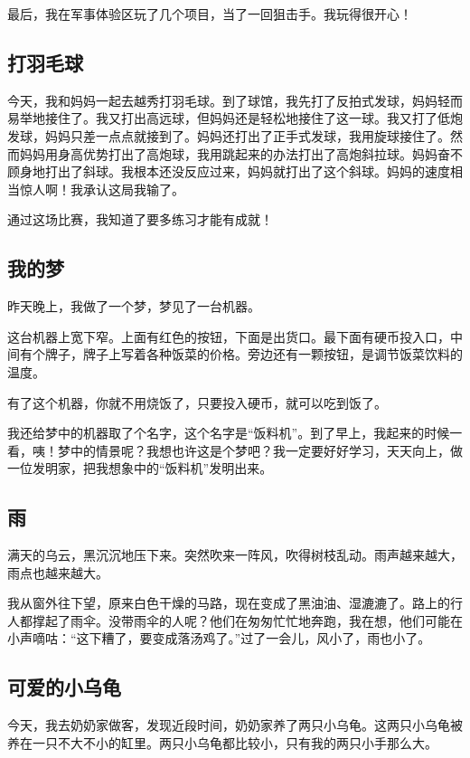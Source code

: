 \documentclass[UTF8,a4paper,titlepage,twoside,10.5pt]{article}
\begin{document}
最后，我在军事体验区玩了几个项目，当了一回狙击手。我玩得很开心！

\subsection{打羽毛球}
\label{sec:orgbea438a}

今天，我和妈妈一起去越秀打羽毛球。到了球馆，我先打了反拍式发球，妈妈轻而易举地接住了。我又打出高远球，但妈妈还是轻松地接住了这一球。我又打了低炮发球，妈妈只差一点点就接到了。妈妈还打出了正手式发球，我用旋球接住了。然而妈妈用身高优势打出了高炮球，我用跳起来的办法打出了高炮斜拉球。妈妈奋不顾身地打出了斜球。我根本还没反应过来，妈妈就打出了这个斜球。妈妈的速度相当惊人啊！我承认这局我输了。

通过这场比赛，我知道了要多练习才能有成就！

\subsection{我的梦}
\label{sec:orga4dbf0c}

昨天晚上，我做了一个梦，梦见了一台机器。

这台机器上宽下窄。上面有红色的按钮，下面是出货口。最下面有硬币投入口，中间有个牌子，牌子上写着各种饭菜的价格。旁边还有一颗按钮，是调节饭菜饮料的温度。

有了这个机器，你就不用烧饭了，只要投入硬币，就可以吃到饭了。

我还给梦中的机器取了个名字，这个名字是“饭料机”。到了早上，我起来的时候一看，咦！梦中的情景呢？我想也许这是个梦吧？我一定要好好学习，天天向上，做一位发明家，把我想象中的“饭料机”发明出来。

\subsection{雨}
\label{sec:orgc84953e}

满天的乌云，黑沉沉地压下来。突然吹来一阵风，吹得树枝乱动。雨声越来越大，雨点也越来越大。

我从窗外往下望，原来白色干燥的马路，现在变成了黑油油、湿漉漉了。路上的行人都撑起了雨伞。没带雨伞的人呢？他们在匆匆忙忙地奔跑，我在想，他们可能在小声嘀咕：“这下糟了，要变成落汤鸡了。”过了一会儿，风小了，雨也小了。

\subsection{可爱的小乌龟}
\label{sec:org6fbc857}

今天，我去奶奶家做客，发现近段时间，奶奶家养了两只小乌龟。这两只小乌龟被养在一只不大不小的缸里。两只小乌龟都比较小，只有我的两只小手那么大。
\end{document}
